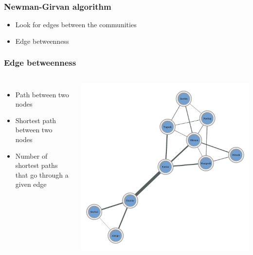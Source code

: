 \documentclass{beamer}
\begin{document}
\begin{frame}
    \frametitle{Newman-Girvan algorithm}
    \centering
    
    \begin{itemize}
        \setlength\itemsep{1em}
        \item{Look for edges between the communities}

        \item{Edge betweenness}
    \end{itemize}
\end{frame}
\begin{frame}
    \frametitle{Edge betweenness}
    \begin{columns}
    \centering
        \begin{itemize}
        \setlength\itemsep{1em}
            \item{Path between two nodes}
            \item{Shortest path between two nodes}
            \item{Number of shortest paths that go through a given edge}
        \end{itemize}
    \includegraphics[width=0.9\columnwidth,trim=0 0 0 0]{gn0.pdf}
    \end{columns}

\end{frame}
\end{document}
